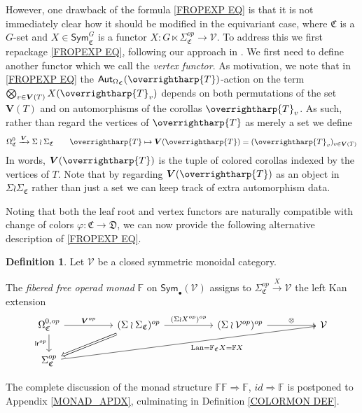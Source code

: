 \documentclass[a4paper,10pt
,draft
]{article}%
\numberwithin{equation}{section}
\numberwithin{figure}{section}
\theoremstyle{definition} %
\newtheorem{definition}[equation]{Definition}%
\newcommand{\vect}[1]{\text{\overrightharp{\ensuremath{#1}}}}
\DeclareMathOperator{\Lan}{Lan}%
\newcommand{\V}{\ensuremath{\mathcal V}}
\newcommand{\1}{\ensuremath{\mathbbm 1}}%
\begin{document}
However, one drawback of the formula  
\eqref{FROPEXP EQ}
is that it is not immediately clear how it should be modified 
in the equivariant case,
where $\mathfrak{C}$ is a $G$-set
and $X \in \mathsf{Sym}^G_{\mathfrak{C}}$
is a functor 
$X \colon G \ltimes \Sigma_{\mathfrak{C}}^{op} \to \V$.
To address this we first repackage \eqref{FROPEXP EQ}, 
following our approach in {\color{red} \cite{BP_geo}}.
We first need to define another functor which we call the \emph{vertex functor}.
As motivation, we note that
in \eqref{FROPEXP EQ}
the $\mathsf{Aut}_{\Omega_{\mathfrak{C}}}(\vect{T})$-action
on the term
$\bigotimes_{v \in \boldsymbol{V}(T)} X(\vect{T}_v)$
depends on both permutations 
of the set $\boldsymbol{V}(T)$
and on automorphisms of the corollas $\vect{T}_v$.
As such, rather than regard the vertices of $\vect{T}$ as merely a set
we define 
\begin{equation}\label{VFUNDEF EQ}
\Omega_{\mathfrak{C}}^0 \xrightarrow{\boldsymbol{V}} \Sigma \wr \Sigma_{\mathfrak{C}}
\qquad 
\vect{T} \mapsto 
\boldsymbol{V}(\vect{T})=(\vect{T}_v )_{v \in \boldsymbol{V}(T)}
\end{equation}
In words, $\boldsymbol{V}(\vect{T})$
is the tuple of colored corollas indexed by the vertices of $T$. 
Note that
by regarding $\boldsymbol{V}(\vect{T})$ as an object in 
$\Sigma \wr \Sigma_{\mathfrak{C}}$ rather than just a set we can keep track of extra automorphism data.

Noting that both the leaf root and vertex functors are naturally compatible with change of colors 
$\varphi \colon \mathfrak{C} \to \mathfrak{D}$, 
we can now provide the following alternative 
description of \eqref{FROPEXP EQ}.



\begin{definition}
Let $\mathcal{V}$ be a closed symmetric monoidal category.

The \textit{fibered free operad monad} $\mathbb{F}$ on $\mathsf{Sym}_\bullet(\mathcal{V})$ 
assigns to 
$\Sigma_{\mathfrak{C}}^{op} \xrightarrow{X} \mathcal{V}$
the left Kan extension
\begin{equation}\label{FREEOP_EQ}
\begin{tikzcd}[column sep = 50pt]
	\Omega^{0,op}_{\mathfrak{C}}
	\arrow[d, "\mathsf{lr}^{op}"']
	\arrow[r, "\boldsymbol{V}^{op}"]
&
	(\Sigma \wr \Sigma_{\mathfrak{C}})^{op} \arrow[r, "(\Sigma \wr X^{op})^{op}"]
	\arrow[dl, Rightarrow]
&
	(\Sigma \wr \V^{op})^{op} \arrow[r, "\otimes"]
&
	\V
\\
	\Sigma^{op}_{\mathfrak{C}}
	\arrow[urrr, "\Lan = \mathbb F_{\mathfrak{C}} X = \mathbb F X"']
\end{tikzcd}
\end{equation}
\end{definition}
The complete discussion of the monad structure
$\mathbb{F}\mathbb{F} \Rightarrow \mathbb{F}$,
$id \Rightarrow \mathbb{F}$ is postponed to Appendix \ref{MONAD_APDX},
culminating in Definition \ref{COLORMON DEF}.
\end{document}
